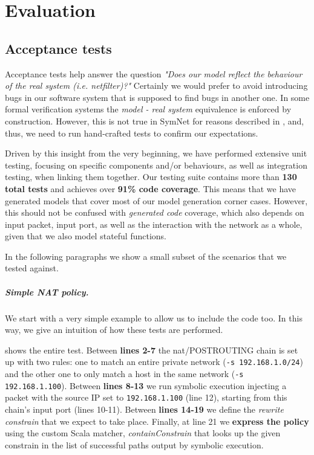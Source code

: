 \chapter{Evaluation}\label{chapter:eval}

\section{Acceptance tests}

Acceptance tests help answer the question \emph{"Does our model reflect the
behaviour of the real system (i.e. netfilter)?"}  Certainly we would prefer to
avoid introducing bugs in our software system that is supposed to find bugs in
another one. In some formal verification systems the \emph{model - real system}
equivalence is enforced by construction.  However, this is not true in SymNet
for reasons described in , and,
thus, we need to run hand-crafted tests to confirm our expectations.

Driven by this insight from the very beginning, we have performed extensive
unit testing, focusing on specific components and/or behaviours, as well as
integration testing, when linking them together.  Our testing suite contains
more than \textbf{130 total tests} and achieves over \textbf{91\% code
coverage}.  This means that we have generated models that cover most of our
model generation corner cases.  However, this should not be confused with
\emph{generated code} coverage, which also depends on input packet, input port,
as well as the interaction with the network as a whole, given that we also
model stateful functions.

In the following paragraphs we show a small subset of the scenarios that we
tested against.

\paragraph{Simple NAT policy.}
We start with a very simple example to allow us to include the code too.  In
this way, we give an intuition of how these tests are performed.

 shows the entire test.  Between
\textbf{lines 2-7} the nat/POSTROUTING chain is set up with two rules: one to
match an entire private network (\lstinline{-s 192.168.1.0/24}) and the other
one to only match a host in the  same network (\lstinline{-s 192.168.1.100}).
Between \textbf{lines 8-13} we run symbolic execution injecting a packet with
the source IP set to \lstinline{192.168.1.100} (line 12), starting from this
chain's input port (lines 10-11).  Between \textbf{lines 14-19} we define the
\emph{rewrite constrain} that we expect to take place.  Finally, at line 21 we
\textbf{express the policy} using the custom Scala matcher,
\emph{containConstrain} that looks up the given constrain in the list of
successful paths output by symbolic execution.

